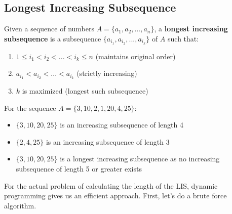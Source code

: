 \subsection{Longest Increasing Subsequence}

  \begin{definition}
    Given a sequence of numbers $A = \{a_1, a_2, ..., a_n\}$, a \textbf{longest increasing subsequence} is a subsequence $\{a_{i_1}, a_{i_2}, ..., a_{i_k}\}$ of $A$ such that:
    \begin{enumerate}
      \item $1 \leq i_1 < i_2 < ... < i_k \leq n$ (maintains original order)
      \item $a_{i_1} < a_{i_2} < ... < a_{i_k}$ (strictly increasing)
      \item $k$ is maximized (longest such subsequence)
    \end{enumerate}
  \end{definition}

  \begin{example}
    For the sequence $A = \{3, 10, 2, 1, 20, 4, 25\}$:
    \begin{itemize}
      \item $\{3, 10, 20, 25\}$ is an increasing subsequence of length 4
      \item $\{2, 4, 25\}$ is an increasing subsequence of length 3
      \item $\{3, 10, 20, 25\}$ is a longest increasing subsequence as no increasing subsequence of length 5 or greater exists
    \end{itemize}
  \end{example}

  For the actual problem of calculating the length of the LIS, dynamic programming gives us an efficient approach. First, let's do a brute force algorithm. 

